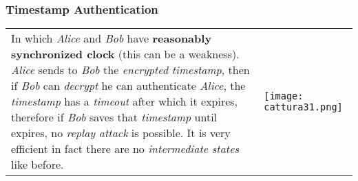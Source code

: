 \documentclass{article}
\begin{document}
\subsubsection{Timestamp Authentication}
\begin{tabular}{C{9cm}  L{10.5cm}}
In which \emph{Alice} and \emph{Bob} have \textbf{reasonably synchronized clock} (this can be a weakness). \emph{Alice} sends to \emph{Bob} the \emph{encrypted timestamp}, then if \emph{Bob} can \emph{decrypt} he can authenticate \emph{Alice}, the \emph{timestamp} has a \emph{timeout} after which it expires, therefore if \emph{Bob} saves that \emph{timestamp} until expires, no \emph{replay attack} is possible. It is very efficient in fact there are no \emph{intermediate states} like before. 
 & \texttt{[image: cattura31.png]}
\end{tabular}
\end{document}
